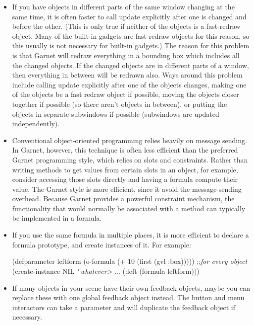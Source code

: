 \begin{itemize}
\item If you have objects in different parts of the same window changing at
the same time, it is often faster to call update explicitly after one
is changed and before the other.  (This is only true if neither of the
objects is a fast-redraw object.  Many of the built-in gadgets are
fast redraw objects for this reason, so this usually is not necessary
for built-in gadgets.)  The reason for this problem is that Garnet
will redraw everything in a bounding box which includes all the
changed objects.  If the changed objects are in different parts of a
window, then everything in between will be redrawn also.  Ways around
this problem include calling update explicitly after one of the
objects changes, making one of the objects be a fast redraw object if
possible, moving the objects closer together if possible (so there
aren't objects in between), or putting the objects in separate
subwindows if possible (subwindows are updated independently).

\item Conventional object-oriented programming relies heavily on message
sending.  In Garnet, however, this technique is often less efficient
than the preferred Garnet programming style, which relies on slots and
constraints.  Rather than writing methods to get values from certain
slots in an object, for example, consider accessing those slots directly and
having a formula compute their value.   The Garnet style is more
efficient, since it avoid the message-sending overhead.  Because
Garnet provides a powerful constraint mechanism, the functionality
that would normally be associated with a method can typically be
implemented in a formula.

\item 
If you use the same formula in multiple places, it is more efficient
to declare a formula prototype, and create instances of it.  For
example:
\begin{programexample}
(defparameter leftform (o-formula (+ 10 (first (gvl :box)))))
;;{\it for every object}
(create-instance NIL {\it {\tt\char`\<}whatever>}
		 ...
		 (:left (formula leftform)))
\end{programexample}


\item If many objects in your scene have their own feedback objects, maybe
you can replace these with one global feedback object instead.  The
button and menu interactors can take a 
parameter and will duplicate the feedback object if necessary.


\end{itemize}
